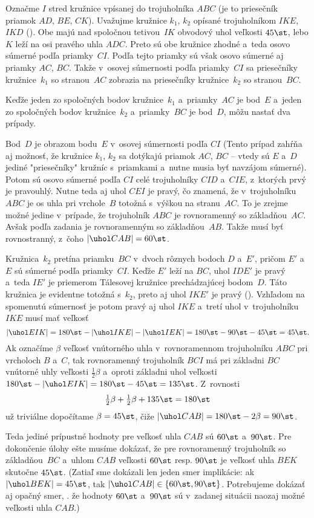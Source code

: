 {%
Označme $I$ stred kružnice vpísanej do trojuholníka $ABC$ (je to priesečník priamok $AD$, $BE$, $CK$). Uvažujme kružnice $k_1$, $k_2$ opísané trojuholníkom $IKE$, $IKD$ (\obr). Obe majú nad spoločnou tetivou~$IK$ obvodový uhol veľkosti $45\st$, lebo $K$ leží na osi pravého uhla $ADC$. Preto sú obe kružnice zhodné a~teda osovo súmerné podľa priamky~$CI$. Podľa tejto priamky sú však osovo súmerné aj priamky $AC$, $BC$. Takže v~osovej súmernosti podľa priamky~$CI$ sa priesečníky kružnice~$k_1$ so stranou~$AC$ zobrazia na priesečníky kružnice~$k_2$ so stranou~$BC$.
%

Keďže jeden zo spoločných bodov kružnice~$k_1$ a~priamky~$AC$ je bod~$E$ a~jeden zo spoločných bodov kružnice~$k_2$ a~priamky~$BC$ je bod~$D$, môžu nastať dva prípady.

Bod~$D$ je obrazom bodu~$E$ v~osovej súmernosti podľa $CI$ (Tento prípad zahŕňa aj možnosť, že kružnice $k_1$, $k_2$ sa dotýkajú priamok $AC$, $BC$ -- vtedy sú $E$ a~$D$ jediné "priesečníky" kružníc s~priamkami a~nutne musia byť navzájom súmerné). Potom sú osovo súmerné podľa $CI$ celé trojuholníky $CID$ a~$CIE$, z~ktorých prvý je pravouhlý. Nutne teda aj uhol $CEI$ je pravý, čo znamená, že v~trojuholníku $ABC$ je os uhla pri vrchole~$B$ totožná s~výškou na stranu~$AC$. To je zrejme možné jedine v~prípade, že trojuholník $ABC$ je rovnoramenný so základňou~$AC$. Avšak podľa zadania je rovnoramenným so základňou~$AB$. Takže musí byť rovnostranný, z~čoho $|\uhol CAB|=60\st$.

Kružnica~$k_2$ pretína priamku~$BC$ v~dvoch rôznych bodoch $D$ a~$E'$, pričom $E'$ a~$E$ sú súmerné podľa priamky~$CI$. Keďže $E'$ leží na $BC$, uhol $IDE'$ je pravý a~teda $IE'$ je priemerom Tálesovej kružnice prechádzajúcej bodom~$D$. Táto kružnica je evidentne totožná s~$k_2$, preto aj uhol $IKE'$ je pravý (\obr).
%
Vzhľadom na spomenutú súmernosť je potom pravý aj uhol $IKE$ a~tretí uhol v~trojuholníku $IKE$ musí mať veľkosť
$$
|\uhol EIK|=180\st-|\uhol IKE|-|\uhol IEK|=180\st-90\st-45\st=45\st.
$$
Ak označíme $\beta$ veľkosť vnútorného uhla v~rovnoramennom trojuholníku $ABC$ pri vrcholoch $B$ a~$C$, tak rovnoramenný trojuholník $BCI$ má pri základni $BC$ vnútorné uhly veľkosti $\frac12\beta$ a~oproti základni uhol veľkosti $180\st-|\uhol EIK|=180\st-45\st=135\st$. Z~rovnosti
$$
\tfrac12\beta+\tfrac12\beta+135\st=180\st
$$
už triviálne dopočítame $\beta=45\st$, čiže $|\uhol CAB|=180\st-2\beta=90\st$.

\smallskip
Teda jediné prípustné hodnoty pre veľkosť uhla $CAB$ sú $60\st$ a~$90\st$. Pre dokončenie úlohy ešte musíme dokázať, že pre rovnoramenný trojuholník so základňou~$BC$ a~uhlom $CAB$ veľkosti $60\st$ resp. $90\st$ je veľkosť uhla $BEK$ skutočne $45\st$. (Zatiaľ sme dokázali len jeden smer implikácie: ak $|\uhol BEK|=45\st$, tak $|\uhol CAB|\in\{60\st,90\st\}$. Potrebujeme dokázať aj opačný smer, \tj. že hodnoty $60\st$ a~$90\st$ sú v~zadanej situácii naozaj možné veľkosti uhla $CAB$.)

}
